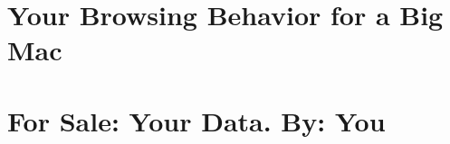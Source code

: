 \section{Your Browsing Behavior for a Big Mac}

\section{For Sale: Your Data. By: You}
\cite{Riederer:2011ta}





